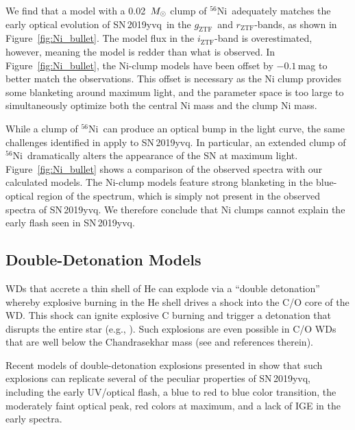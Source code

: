 \documentclass[twocolumn]{aastex63}
\newcommand{\rztf}{$r_\mathrm{ZTF}$}
\newcommand{\gztf}{$g_\mathrm{ZTF}$}
\newcommand{\iztf}{$i_\mathrm{ZTF}$}
\newcommand{\radni}{$^{56}$Ni}
\newcommand{\sn}{SN\,2019yvq}
\begin{document}
We find that a model with a 0.02~$M_{\rm{\odot}}$ clump of \radni\ adequately
matches the early optical evolution of \sn\ in the \gztf\ and \rztf-bands, as
shown in Figure~\ref{fig:Ni_bullet}. The model flux in the \iztf-band
is overestimated, however, meaning the model is redder than what is observed.
In Figure~\ref{fig:Ni_bullet}, the Ni-clump models have been offset by
$-0.1$\,mag to better match the observations. This offset is necessary as the
Ni clump provides some blanketing around maximum light, and the parameter
space is too large to simultaneously optimize both the central Ni mass and the
clump Ni mass.

While a clump of \radni\ can produce an optical bump in the light curve, the
same challenges identified in \citet{Magee20a} apply to \sn. In particular, an
extended clump of \radni\ dramatically alters the appearance of the SN at
maximum light. Figure~\ref{fig:Ni_bullet} shows a comparison of the observed
spectra with our calculated models. The Ni-clump models feature strong
blanketing in the blue-optical region of the spectrum, which is simply not
present in the observed spectra of \sn. We therefore conclude that Ni clumps
cannot explain the early flash seen in \sn.

\subsection{Double-Detonation Models}

WDs that accrete a thin shell of He can explode via a ``double detonation''
whereby explosive burning in the He shell drives a shock into the C/O core of
the WD. This shock can ignite explosive C burning and trigger a detonation
that disrupts the entire star (e.g., \citealt{Nomoto82,Nomoto82a,Woosley94}).
Such explosions are even possible in C/O WDs that are well below the
Chandrasekhar mass (see \citealt{Fink07, Fink10} and references therein).

Recent models of double-detonation explosions presented in \citet{Polin19}
show that such explosions can replicate several of the peculiar properties of
\sn, including the early UV/optical flash, a blue to red to blue color
transition, the moderately faint optical peak, red colors at maximum, and a
lack of IGE in the early spectra.
\end{document}

